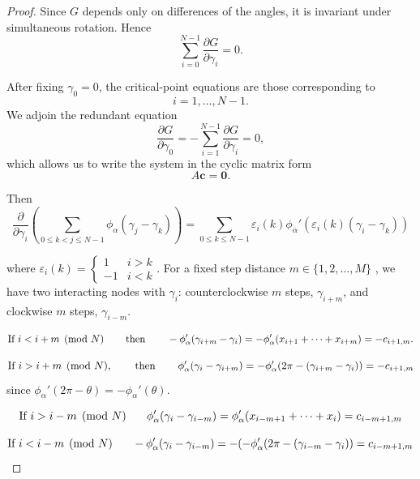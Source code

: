 \documentclass{article}
\begin{document}
\begin{proof}

 

Since $G$ depends only on differences of the angles, it is invariant under simultaneous rotation. Hence
\[
\sum_{i=0}^{N-1}\frac{\partial G}{\partial \gamma_i}=0.
\]

After fixing $\gamma_0=0$, the critical-point equations are those corresponding to
\[
i=1,\dots,N-1.
\]
We adjoin the redundant equation
\[
\frac{\partial G}{\partial \gamma_0}
=
-\sum_{i=1}^{N-1}\frac{\partial G}{\partial \gamma_i}
=
0,
\]
which allows us to write the system in the cyclic matrix form
\[
A\mathbf{c}=\mathbf{0}.
\]
 
Then
$$\frac{\partial}{\partial \gamma_i}\left(\sum_{0\leq k<j\leq N-1} \phi_\alpha (\gamma_j-\gamma_k)\right) =\sum_{0\leq k\leq N-1} \varepsilon_i(k) \phi_\alpha'(\varepsilon_i(k)(\gamma_i-\gamma_k))$$
 
where $\varepsilon_i(k)= \begin{cases} 1 & i>k \\ -1 & i < k \end{cases}$. For a fixed step distance $m\in \{1,2,\dots, M\}$ , we have two interacting nodes with $\gamma_i$: counterclockwise $m$ steps, $\gamma_{i+m}$, and clockwise $m$ steps, $\gamma_{i-m}$.

$$\text{If } i < i+m \pmod{N} \hspace{0.25in} \text{ then } \hspace{0.25in}-\phi_\alpha  '(\gamma_{i+m}-\gamma_i)= -\phi_\alpha '(x_{i+1}+\dots+ x_{i+m})= -c_{i+1,m}.$$ 

$$\text{If } i > i+m \pmod{N}, \hspace{0.25in} \text{ then } \hspace{0.25in} \phi_\alpha  '(\gamma_i-\gamma_{i+m})=-\phi_\alpha'(2\pi -(\gamma_{i+m} - \gamma_i))= -c_{i+1,m}$$
since $\phi_\alpha'(2\pi-\theta)=-\phi_\alpha'(\theta)$.

$$\text{If } i > i-m \pmod{N} \hspace{0.25in} \phi_\alpha  '(\gamma_i-\gamma_{i-m})=\phi_\alpha '(x_{i-m+1}+\dots+x_{i})=c_{i-m+1,m}$$

$$\text{If } i < i-m \pmod{N} \hspace{0.25in} -\phi_\alpha  '(\gamma_i-\gamma_{i-m})=-(-\phi_\alpha'(2\pi -(\gamma_{i-m}-\gamma_i))=c_{i-m+1,m}$$


\end{proof}
\end{document}
